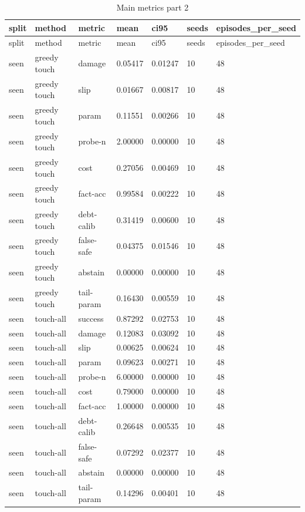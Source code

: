 \documentclass{article}
\begin{document}
\begin{center}
\tiny
\renewcommand{\arraystretch}{0.92}
\setlength{\tabcolsep}{3pt}
\begin{longtable}{lllllll}
\caption{Main metrics part 2}\label{tab:main-metrics-2}\\
\toprule
split & method & metric & mean & ci95 & seeds & episodes\_per\_seed \\
\midrule
\endfirsthead
\toprule
split & method & metric & mean & ci95 & seeds & episodes\_per\_seed \\
\midrule
\endhead
seen & greedy touch & damage & 0.05417 & 0.01247 & 10 & 48 \\
seen & greedy touch & slip & 0.01667 & 0.00817 & 10 & 48 \\
seen & greedy touch & param & 0.11551 & 0.00266 & 10 & 48 \\
seen & greedy touch & probe-n & 2.00000 & 0.00000 & 10 & 48 \\
seen & greedy touch & cost & 0.27056 & 0.00469 & 10 & 48 \\
seen & greedy touch & fact-acc & 0.99584 & 0.00222 & 10 & 48 \\
seen & greedy touch & debt-calib & 0.31419 & 0.00600 & 10 & 48 \\
seen & greedy touch & false-safe & 0.04375 & 0.01546 & 10 & 48 \\
seen & greedy touch & abstain & 0.00000 & 0.00000 & 10 & 48 \\
seen & greedy touch & tail-param & 0.16430 & 0.00559 & 10 & 48 \\
seen & touch-all & success & 0.87292 & 0.02753 & 10 & 48 \\
seen & touch-all & damage & 0.12083 & 0.03092 & 10 & 48 \\
seen & touch-all & slip & 0.00625 & 0.00624 & 10 & 48 \\
seen & touch-all & param & 0.09623 & 0.00271 & 10 & 48 \\
seen & touch-all & probe-n & 6.00000 & 0.00000 & 10 & 48 \\
seen & touch-all & cost & 0.79000 & 0.00000 & 10 & 48 \\
seen & touch-all & fact-acc & 1.00000 & 0.00000 & 10 & 48 \\
seen & touch-all & debt-calib & 0.26648 & 0.00535 & 10 & 48 \\
seen & touch-all & false-safe & 0.07292 & 0.02377 & 10 & 48 \\
seen & touch-all & abstain & 0.00000 & 0.00000 & 10 & 48 \\
seen & touch-all & tail-param & 0.14296 & 0.00401 & 10 & 48 \\

\end{longtable}
\end{center}
\end{document}
